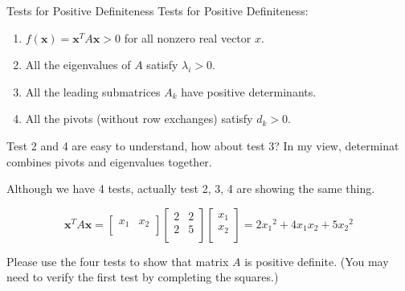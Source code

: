 \documentclass{beamer}
\begin{document}
\begin{frame}{Tests for Positive Definiteness}
    Tests for Positive Definiteness:
\begin{enumerate}
    \item $f\left( \mathbf{x} \right) =\mathbf{x}^TA\mathbf{x}>0$ for all nonzero real vector $x$.
    \item All the eigenvalues of $A$ satisfy $\lambda _i>0$.
    \item All the leading submatrices $A_k$ have positive determinants.
    \item All the pivots (without row exchanges) satisfy $d_k>0$.
\end{enumerate}

\vspace{3pt}
Test 2 and 4 are easy to understand, how about test 3? In my view, determinat combines pivots and eigenvalues together.

\vspace{3pt}
Although we have 4 tests, actually test 2, 3, 4 are showing the same thing.

\begin{equation*}
    \mathbf{x}^TA\mathbf{x}=\left[ \begin{matrix}
        x_1&		x_2\\
    \end{matrix} \right] \left[ \begin{matrix}
        2&		2\\
        2&		5\\
    \end{matrix} \right] \left[ \begin{array}{c}
        x_1\\
        x_2\\
    \end{array} \right] =2{x_1}^2+4x_1x_2+5{x_2}^2
\end{equation*}

Please use the four tests to show that matrix $A$ is positive definite. (You may need to verify the first test by completing the squares.)

\end{frame}
\end{document}

